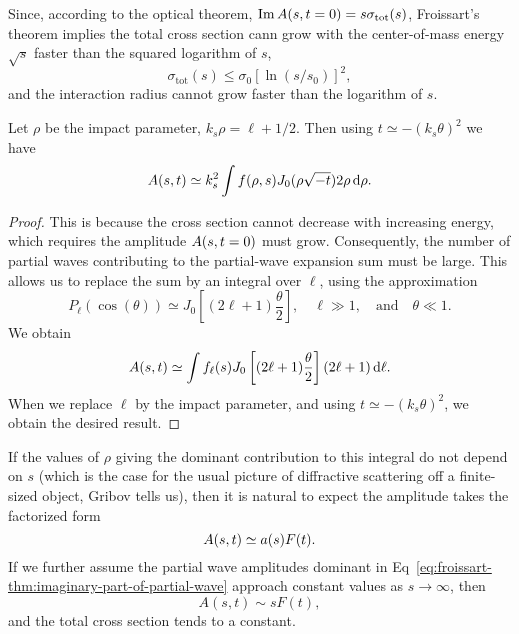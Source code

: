 \begin{corollary}
Since, according to the optical theorem, $\operatorname{Im}A(s,t=0)=s\sigma_{\text{tot}}(s)$,
Froissart's theorem implies the total cross section cann grow with the
center-of-mass energy $\sqrt{s}$ faster than the squared logarithm of
$s$,
\begin{equation}
\sigma_{\text{tot}}(s)\leq\sigma_{0}[\ln(s/s_{0})]^{2},
\end{equation}
and the interaction radius cannot grow faster than the logarithm of $s$.
\end{corollary}

\begin{corollary}
Let $\rho$ be the impact parameter, $k_{s}\rho = \ell+1/2$.
Then using
$t\simeq-(k_{s}\theta)^{2}$ we have
\begin{equation}
A(s,t)\simeq k_{s}^{2}\int f(\rho,s)J_{0}(\rho\sqrt{-t})2\rho\,\mathrm{d}\rho.
\end{equation}
\end{corollary}

\begin{proof}
This is because the cross section cannot decrease with increasing
energy, which requires the amplitude $A(s,t=0)$ must grow.
Consequently, the number of partial waves contributing to the
partial-wave expansion sum must be large. This allows us to replace the
sum by an integral over $\ell$, using the approximation
\begin{equation}
P_{\ell}(\cos(\theta))\simeq J_{0}\left[(2\ell+1)\frac{\theta}{2}\right],\quad\ell\gg1,\quad\mbox{and}\quad\theta\ll1.
\end{equation}
We obtain
\begin{equation}
A(s,t)\simeq\int f_{\ell}(s)J_{0}\left[(2\ell+1)\frac{\theta}{2}\right](2\ell+1)\,\mathrm{d}\ell.
\end{equation}
When we replace $\ell$ by the impact parameter, and using $t\simeq-(k_{s}\theta)^{2}$,
we obtain the desired result.
\end{proof}

\M[1]
If the values of $\rho$ giving the dominant contribution to this
integral do not depend on $s$ (which is the case for the usual picture
of diffractive scattering off a finite-sized object, Gribov tells us),
then it is natural to expect the amplitude takes the factorized form
\begin{equation}
A(s,t)\simeq a(s)F(t).
\end{equation}
If we further assume the partial wave amplitudes dominant in
Eq~\eqref{eq:froissart-thm:imaginary-part-of-partial-wave}
approach constant values as $s\to\infty$, then
\begin{equation}
A(s,t)\sim sF(t),
\end{equation}
and the total cross section tends to a constant.
